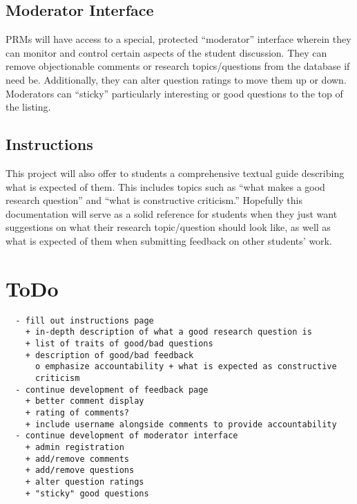 \documentclass{article}
\begin{document}
\subsection{Moderator Interface}
PRMs will have access to a special, protected ``moderator'' interface
wherein they can monitor and control certain aspects of the student
discussion. They can remove objectionable comments or research
topics/questions from the database if need be. Additionally, they can alter
question ratings to move them up or down. Moderators can ``sticky''
particularly interesting or good questions to the top of the listing.

\subsection{Instructions}
This project will also offer to students a comprehensive textual guide
describing what is expected of them. This includes topics such as ``what
makes a good research question'' and ``what is constructive criticism.''
Hopefully this documentation will serve as a solid reference for students
when they just want suggestions on what their research topic/question
should look like, as well as what is expected of them when submitting
feedback on other students' work.

\section{ToDo}

\begin{verbatim}
  - fill out instructions page
    + in-depth description of what a good research question is
    + list of traits of good/bad questions
    + description of good/bad feedback
      o emphasize accountability + what is expected as constructive
      criticism
  - continue development of feedback page
    + better comment display
    + rating of comments?
    + include username alongside comments to provide accountability
  - continue development of moderator interface
    + admin registration
    + add/remove comments
    + add/remove questions
    + alter question ratings
    + "sticky" good questions
\end{verbatim}
\end{document}
